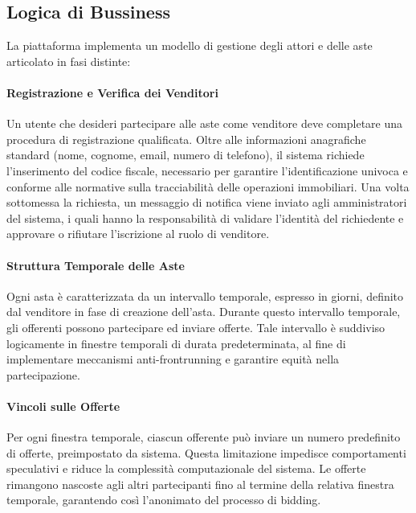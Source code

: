 \subsection{Logica di Bussiness}

La piattaforma implementa un modello di gestione degli attori e delle aste articolato in fasi distinte:

\paragraph{Registrazione e Verifica dei Venditori}
Un utente che desideri partecipare alle aste come venditore deve completare una procedura di registrazione qualificata. Oltre alle informazioni anagrafiche standard (nome, cognome, email, numero di telefono), il sistema richiede l'inserimento del codice fiscale, necessario per garantire l'identificazione univoca e conforme alle normative sulla tracciabilità delle operazioni immobiliari. Una volta sottomessa la richiesta, un messaggio di notifica viene inviato agli amministratori del sistema, i quali hanno la responsabilità di validare l'identità del richiedente e approvare o rifiutare l'iscrizione al ruolo di venditore.

\paragraph{Struttura Temporale delle Aste}
Ogni asta è caratterizzata da un intervallo temporale, espresso in giorni, definito dal venditore in fase di creazione dell'asta. Durante questo intervallo temporale, gli offerenti possono partecipare ed inviare offerte. Tale intervallo è suddiviso logicamente in finestre temporali di durata predeterminata, al fine di implementare meccanismi anti-frontrunning e garantire equità nella partecipazione.

\paragraph{Vincoli sulle Offerte}
Per ogni finestra temporale, ciascun offerente può inviare un numero predefinito di offerte, preimpostato da sistema. Questa limitazione impedisce comportamenti speculativi e riduce la complessità computazionale del sistema. Le offerte rimangono nascoste agli altri partecipanti fino al termine della relativa finestra temporale, garantendo così l'anonimato del processo di bidding.


